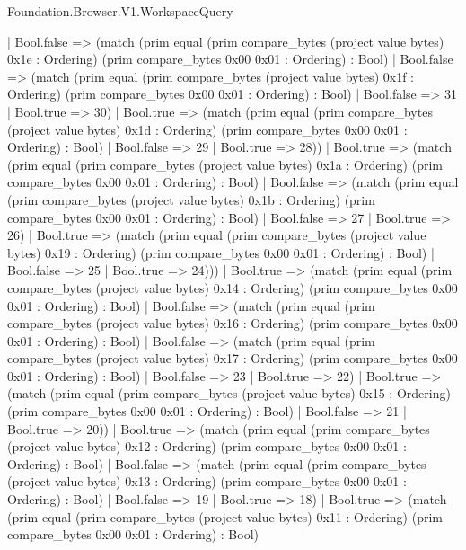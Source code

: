 \begin{lexlean}{Foundation.Browser.V1.WorkspaceQuery}
\begin{semanticmodule}
{                | Bool.false => (match (prim equal (prim compare_bytes (project value bytes) 0x1e : Ordering) (prim compare_bytes 0x00 0x01 : Ordering) : Bool)
                  | Bool.false => (match (prim equal (prim compare_bytes (project value bytes) 0x1f : Ordering) (prim compare_bytes 0x00 0x01 : Ordering) : Bool)
                    | Bool.false => 31
                    | Bool.true => 30)
                  | Bool.true => (match (prim equal (prim compare_bytes (project value bytes) 0x1d : Ordering) (prim compare_bytes 0x00 0x01 : Ordering) : Bool)
                    | Bool.false => 29
                    | Bool.true => 28))
                | Bool.true => (match (prim equal (prim compare_bytes (project value bytes) 0x1a : Ordering) (prim compare_bytes 0x00 0x01 : Ordering) : Bool)
                  | Bool.false => (match (prim equal (prim compare_bytes (project value bytes) 0x1b : Ordering) (prim compare_bytes 0x00 0x01 : Ordering) : Bool)
                    | Bool.false => 27
                    | Bool.true => 26)
                  | Bool.true => (match (prim equal (prim compare_bytes (project value bytes) 0x19 : Ordering) (prim compare_bytes 0x00 0x01 : Ordering) : Bool)
                    | Bool.false => 25
                    | Bool.true => 24)))
              | Bool.true => (match (prim equal (prim compare_bytes (project value bytes) 0x14 : Ordering) (prim compare_bytes 0x00 0x01 : Ordering) : Bool)
                | Bool.false => (match (prim equal (prim compare_bytes (project value bytes) 0x16 : Ordering) (prim compare_bytes 0x00 0x01 : Ordering) : Bool)
                  | Bool.false => (match (prim equal (prim compare_bytes (project value bytes) 0x17 : Ordering) (prim compare_bytes 0x00 0x01 : Ordering) : Bool)
                    | Bool.false => 23
                    | Bool.true => 22)
                  | Bool.true => (match (prim equal (prim compare_bytes (project value bytes) 0x15 : Ordering) (prim compare_bytes 0x00 0x01 : Ordering) : Bool)
                    | Bool.false => 21
                    | Bool.true => 20))
                | Bool.true => (match (prim equal (prim compare_bytes (project value bytes) 0x12 : Ordering) (prim compare_bytes 0x00 0x01 : Ordering) : Bool)
                  | Bool.false => (match (prim equal (prim compare_bytes (project value bytes) 0x13 : Ordering) (prim compare_bytes 0x00 0x01 : Ordering) : Bool)
                    | Bool.false => 19
                    | Bool.true => 18)
                  | Bool.true => (match (prim equal (prim compare_bytes (project value bytes) 0x11 : Ordering) (prim compare_bytes 0x00 0x01 : Ordering) : Bool)
}
\end{semanticmodule}
\end{lexlean}

